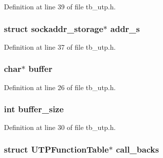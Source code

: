 Definition at line 39 of file tb\-\_\-utp.\-h.

\hypertarget{structtb__utp__t_a6c6b934648a67540d62892076f229e35}{
\subsubsection[{addr\-\_\-s}]{\setlength{\rightskip}{0pt plus 5cm}struct sockaddr\-\_\-storage$\ast$ addr\-\_\-s}}\label{structtb__utp__t_a6c6b934648a67540d62892076f229e35}


Definition at line 37 of file tb\-\_\-utp.\-h.

\hypertarget{structtb__utp__t_aff2566f4c366b48d73479bef43ee4d2e}{
\subsubsection[{buffer}]{\setlength{\rightskip}{0pt plus 5cm}char$\ast$ buffer}}\label{structtb__utp__t_aff2566f4c366b48d73479bef43ee4d2e}


Definition at line 26 of file tb\-\_\-utp.\-h.

\hypertarget{structtb__utp__t_af22ff4ab7a026e6c3b4b08eafb2df027}{
\subsubsection[{buffer\-\_\-size}]{\setlength{\rightskip}{0pt plus 5cm}int buffer\-\_\-size}}\label{structtb__utp__t_af22ff4ab7a026e6c3b4b08eafb2df027}


Definition at line 30 of file tb\-\_\-utp.\-h.

\hypertarget{structtb__utp__t_af8b7b669057336d848a5117e4232a83a}{
\subsubsection[{call\-\_\-backs}]{\setlength{\rightskip}{0pt plus 5cm}struct U\-T\-P\-Function\-Table$\ast$ call\-\_\-backs}}\label{structtb__utp__t_af8b7b669057336d848a5117e4232a83a}


